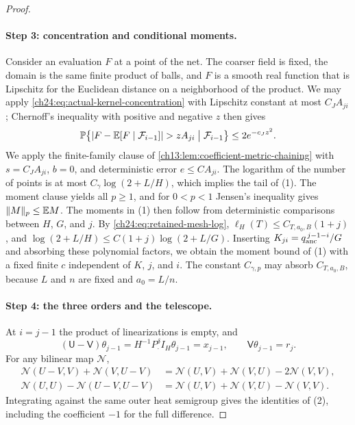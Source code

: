 \begin{proof}
\paragraph{Step 3: concentration and conditional moments.}
Consider an evaluation $F$ at a point of the net. The coarser field is fixed, the domain is the same finite product of balls, and $F$ is a smooth real function that is Lipschitz for the Euclidean distance on a neighborhood of the product. We may apply \eqref{ch24:eq:actual-kernel-concentration} with Lipschitz constant at most $C_JA_{ji}$; Chernoff's inequality with positive and negative $z$ then gives
\[
 \mathbb P\bigl\{\lvert F-\mathbb E[F\mid\mathcal F_{i-1}]\rvert>zA_{ji}\bigm|\mathcal F_{i-1}\bigr\}\le2e^{-c_Jz^2}.
\]
We apply the finite-family clause of \cref{ch13:lem:coefficient-metric-chaining} with $s=C_JA_{ji}$, $b=0$, and deterministic error $e\le CA_{ji}$. The logarithm of the number of points is at most $C_\gamma\log(2+L/H)$, which implies the tail of (1). The moment clause yields all $p\ge1$, and for $0<p<1$ Jensen's inequality gives $\lVert M\rVert_p\le\mathbb E M$. The moments in (1) then follow from deterministic comparisons between $H$, $G$, and $j$. By \eqref{ch24:eq:retained-mesh-log}, $\ell_H(T)\le C_{T,a_0,B}(1+j)$, and $\log(2+L/H)\le C(1+j)\log(2+L/G)$. Inserting $K_{ji}=q_{\mathrm{anc}}^{\,j-1-i}/G$ and absorbing these polynomial factors, we obtain the moment bound of (1) with a fixed finite $c$ independent of $K$, $j$, and $i$. The constant $C_{\gamma,p}$ may absorb $C_{T,a_0,B}$, because $L$ and $n$ are fixed and $a_0=L/n$.

\paragraph{Step 4: the three orders and the telescope.}
At $i=j-1$ the product of linearizations is empty, and
\[
 (\mathsf U-\mathsf V)\theta_{j-1}=H^{-1}P_\cdot^\delta I_H\theta_{j-1}=x_{j-1},\qquad \mathsf V\theta_{j-1}=r_j.
\]
For any bilinear map $\mathcal N$,
\begin{align*}
 \mathcal N(U-V,V)+\mathcal N(V,U-V)&=\mathcal N(U,V)+\mathcal N(V,U)-2\mathcal N(V,V),\\
 \mathcal N(U,U)-\mathcal N(U-V,U-V)&=\mathcal N(U,V)+\mathcal N(V,U)-\mathcal N(V,V).
\end{align*}
Integrating against the same outer heat semigroup gives the identities of (2), including the coefficient $-1$ for the full difference.


\end{proof}
